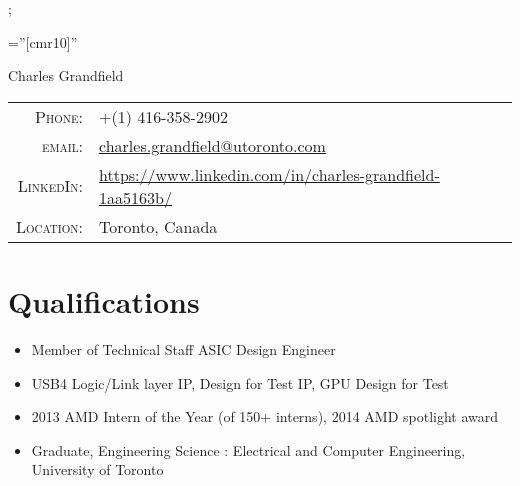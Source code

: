 \documentclass[a4paper,10pt]{article}
\begin{document}
;

\hspace{-0.75cm}
\makebox[0pt][s]{
  \raisebox{-\totalheight}[0pt][0pt]{
``  \begin{tikzpicture}
	\draw[draw=white,fill=white, opacity=0.9] (0,0) rectangle ++(\paperwidth-2cm,\paperheight-4cm);
    \end{tikzpicture}
  }
}

\pagestyle{empty}
\font\fb=''[cmr10]''

\par{\centering
		{\Huge Charles Grandfield
	}\par}

\vspace{1ex}

\begin{tabular}{rl}
    \textsc{Phone:}      & +(1) 416-358-2902\\
    \textsc{email:}        & \href{mailto:charles.grandfield@utoronto.com}{charles.grandfield@utoronto.com}\\
    \textsc{LinkedIn:}   &  \href{https://www.linkedin.com/in/charles-grandfield-1aa5163b/}{https://www.linkedin.com/in/charles-grandfield-1aa5163b/} \\
    \textsc{Location:}   &  Toronto, Canada
\end{tabular}

\vspace{1ex}
\section{Qualifications}
\begin{itemize}
	\item Member of Technical Staff ASIC Design Engineer
	\item USB4 Logic/Link layer IP, Design for Test IP, GPU Design for Test
	\item 2013 AMD Intern of the Year (of 150+ interns), 2014 AMD spotlight award
	\item Graduate, Engineering Science : Electrical and Computer Engineering, University of Toronto
\end{itemize}
\end{document}
